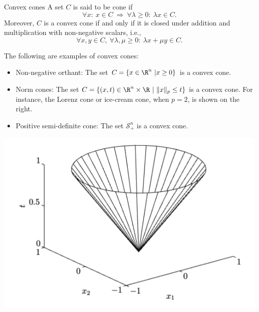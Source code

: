 \begin{ex}{Convex cones}
    A set $C$ is said to be cone if
    \begin{equation*}
        \forall x: \ x \in C \ \Rightarrow \ \forall \lambda \geq 0: \ \lambda x \in C.
    \end{equation*}
    Moreover, $C$ is a convex cone if and only if it is closed under addition and multiplication with non-negative scalars, i\@.e\@.,
    \begin{equation*}
        \forall x,y \in C, \ \forall \lambda, \mu \geq 0: \ \lambda x + \mu y \in C.
    \end{equation*}
    \begin{minipage}{0.66\textwidth}
        The following are examples of convex cones:
        \begin{itemize}
            \item 
                Non-negative orthant: The set $C = \{ x \in \R^n \ | x \geq 0 \}$ is a convex cone. 
            \item
                Norm cones: The set $C = \{ (x,t) \in \R^n \times \R \ | \ \|x\|_p \leq t \}$ is a convex cone. For instance, the Lorenz cone or ice-cream cone, when $p = 2$, is shown on the right.
            \item Positive semi-definite cone: The set $\mathcal{S}^n_+$ is a convex cone.
        \end{itemize}
    \end{minipage}
    \begin{minipage}{0.32\textwidth}
        \vspace{0.3cm}
        \begin{center}
            \includegraphics[scale = 0.25]{Images/Fundamental/LorenzCone.png}
        \end{center}
    \end{minipage}
\end{ex}



